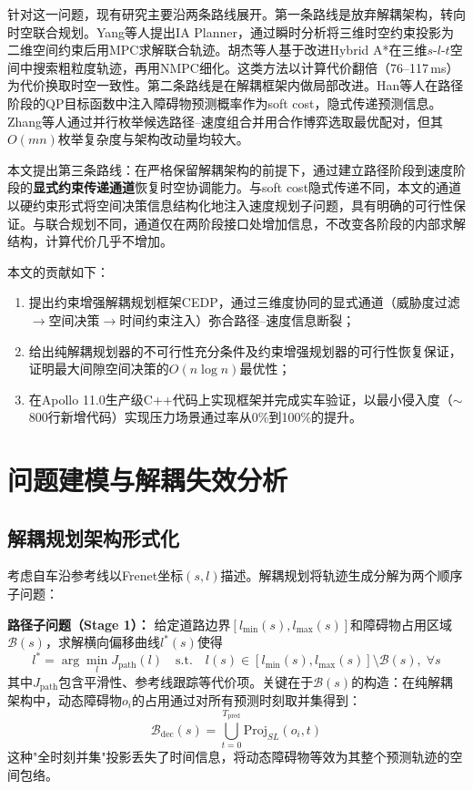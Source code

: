 \documentclass[a4paper,11pt]{article}
\begin{document}
针对这一问题，现有研究主要沿两条路线展开。第一条路线是放弃解耦架构，转向时空联合规划。Yang等人提出IA Planner，通过瞬时分析将三维时空约束投影为二维空间约束后用MPC求解联合轨迹。胡杰等人基于改进Hybrid A*在三维$s$-$l$-$t$空间中搜索粗粒度轨迹，再用NMPC细化。这类方法以计算代价翻倍（76--117\,ms）为代价换取时空一致性。第二条路线是在解耦框架内做局部改进。Han等人在路径阶段的QP目标函数中注入障碍物预测概率作为soft cost，隐式传递预测信息。Zhang等人通过并行枚举候选路径--速度组合并用合作博弈选取最优配对，但其$O(mn)$枚举复杂度与架构改动量均较大。

本文提出第三条路线：在严格保留解耦架构的前提下，通过建立路径阶段到速度阶段的\textbf{显式约束传递通道}恢复时空协调能力。与soft cost隐式传递不同，本文的通道以硬约束形式将空间决策信息结构化地注入速度规划子问题，具有明确的可行性保证。与联合规划不同，通道仅在两阶段接口处增加信息，不改变各阶段的内部求解结构，计算代价几乎不增加。

本文的贡献如下：
\begin{enumerate}
  \item 提出约束增强解耦规划框架CEDP，通过三维度协同的显式通道（威胁度过滤$\to$空间决策$\to$时间约束注入）弥合路径--速度信息断裂；
  \item 给出纯解耦规划器的不可行性充分条件及约束增强规划器的可行性恢复保证，证明最大间隙空间决策的$O(n\log n)$最优性；
  \item 在Apollo 11.0生产级C++代码上实现框架并完成实车验证，以最小侵入度（$\sim$800行新增代码）实现压力场景通过率从0\%到100\%的提升。
\end{enumerate}

\section{问题建模与解耦失效分析}

\subsection{解耦规划架构形式化}

考虑自车沿参考线以Frenet坐标$(s, l)$描述。解耦规划将轨迹生成分解为两个顺序子问题：

\textbf{路径子问题（Stage 1）：} 给定道路边界$[l_{\min}(s), l_{\max}(s)]$和障碍物占用区域$\mathcal{B}(s)$，求解横向偏移曲线$l^*(s)$使得
\begin{equation}
  l^* = \arg\min_{l} J_{\text{path}}(l) \quad \text{s.t.} \quad l(s) \in [l_{\min}(s), l_{\max}(s)] \setminus \mathcal{B}(s), \;\forall s
\end{equation}
其中$J_{\text{path}}$包含平滑性、参考线跟踪等代价项。关键在于$\mathcal{B}(s)$的构造：在纯解耦架构中，动态障碍物$o_i$的占用通过对所有预测时刻取并集得到：
\begin{equation}\label{eq:static-proj}
  \mathcal{B}_{\text{dec}}(s) = \bigcup_{t=0}^{T_{\text{pred}}} \text{Proj}_{SL}(o_i, t)
\end{equation}
这种"全时刻并集"投影丢失了时间信息，将动态障碍物等效为其整个预测轨迹的空间包络。
\end{document}
